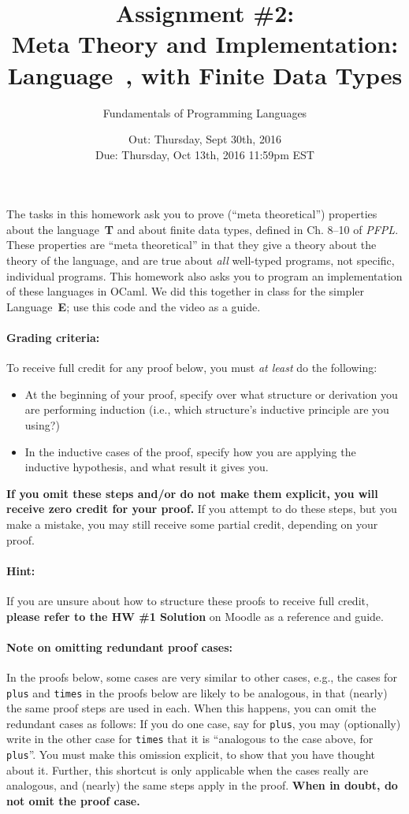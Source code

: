 \documentclass[11pt]{article}
\title{Assignment \#2: \\
  Meta Theory and Implementation:
  \\Language~\T, with Finite Data Types}
\author{Fundamentals of Programming Languages}
\date{Out: Thursday, Sept 30th, 2016\\
      Due: Thursday, Oct 13th, 2016 11:59pm EST}
\newcommand{\E}{\textbf{\textsf{E}}\xspace}
\newcommand{\T}{\textbf{\textsf{T}}\xspace}
\begin{document}
\maketitle

The tasks in this homework ask you to prove (``meta theoretical'')
properties about the language~\T and about finite data types, defined
in Ch. 8--10 of \emph{PFPL}.  These properties are ``meta
theoretical'' in that they give a theory about the theory of the
language, and are true about \emph{all} well-typed programs, not
specific, individual programs.
%
This homework also asks you to program an implementation of these
languages in OCaml.
%
We did this together in class for the simpler Language~\E; use this
code and the video as a guide.

\paragraph{Grading criteria:} To receive full credit for any proof below, you must \emph{at least} do the following:
\begin{itemize}
\item At the beginning of your proof, specify over what structure or derivation you are performing induction (i.e., which structure's inductive principle are you using?)
\item In the inductive cases of the proof, specify how you are applying the inductive hypothesis, and what result it gives you.
\end{itemize}
\textbf{If you omit these steps and/or do not make them explicit, you
  will receive zero credit for your proof.}  If you attempt to do
these steps, but you make a mistake, you may still receive some partial credit, depending on your proof.

\paragraph{Hint:}
If you are unsure about how to structure these proofs to receive full credit, 
\textbf{please refer to the HW \#1 Solution} on Moodle as a reference and guide.

\paragraph{Note on omitting redundant proof cases:} In the proofs below, some cases are very
similar to other cases, e.g., the cases for \texttt{plus} and
\texttt{times} in the proofs below are likely to be analogous, in that
(nearly) the same proof steps are used in each.
%
When this happens, you can omit the redundant cases as follows: If you
do one case, say for \texttt{plus}, you may (optionally) write in the
other case for \texttt{times} that it is ``analogous to the case
above, for \texttt{plus}''.  You must make this omission explicit, to
show that you have thought about it.  Further, this shortcut is only
applicable when the cases really are analogous, and (nearly) the same
steps apply in the proof.  \textbf{When in doubt, do not omit the
  proof case.}
\end{document}
